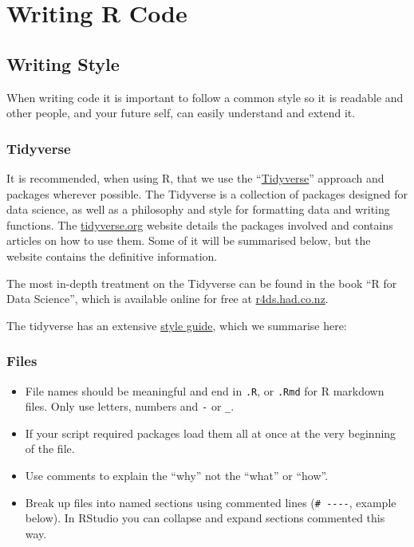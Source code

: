 \documentclass[]{book}
\providecommand{\tightlist}{%
  \setlength{\itemsep}{0pt}\setlength{\parskip}{0pt}}
\theoremstyle{definition}
\theoremstyle{definition}
\theoremstyle{definition}
\theoremstyle{remark}
\begin{document}
\chapter{Writing R Code}\label{writing}

\section{Writing Style}\label{writing-style}

When writing code it is important to follow a common style so it is
readable and other people, and your future self, can easily understand
and extend it.

\subsection{Tidyverse}\label{tidyverse}

It is recommended, when using R, that we use the
``\href{https://www.tidyverse.org/}{Tidyverse}'' approach and packages
wherever possible. The Tidyverse is a collection of packages designed
for data science, as well as a philosophy and style for formatting data
and writing functions. The
\href{https://www.tidyverse.org/}{tidyverse.org} website details the
packages involved and contains articles on how to use them. Some of it
will be summarised below, but the website contains the definitive
information.

The most in-depth treatment on the Tidyverse can be found in the book
``R for Data Science'', which is available online for free at
\href{http://r4ds.had.co.nz/}{r4ds.had.co.nz}.

The tidyverse has an extensive \href{http://style.tidyverse.org/}{style
guide}, which we summarise here:

\subsection{Files}\label{files}

\begin{itemize}
\tightlist
\item
  File names should be meaningful and end in \texttt{.R}, or
  \texttt{.Rmd} for R markdown files. Only use letters, numbers and
  \texttt{-} or \texttt{\_}.
\item
  If your script required packages load them all at once at the very
  beginning of the file.
\item
  Use comments to explain the ``why'' not the ``what'' or ``how''.
\item
  Break up files into named sections using commented lines
  (\texttt{\#\ -\/-\/-\/-}, example below). In RStudio you can collapse
  and expand sections commented this way.
\end{itemize}
\end{document}
